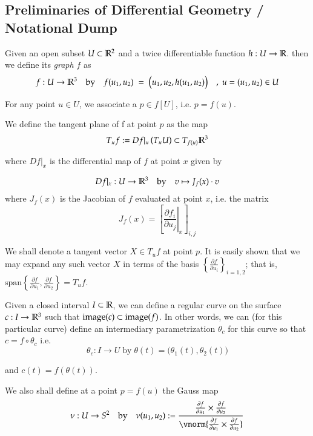         \subsection{Preliminaries of Differential Geometry / Notational Dump}
        
        Given an open subset $U\subset \mathbb{R}^2$ and a twice differentiable function  $h: U \to \mathbb{R}$.
        then we define its \textit{graph} $f$ as
        \[
	        f: U \to \mathbb{R}^3 \quad \textrm{by} \quad f(u_1, u_2) \;=\; \big(u_1 , u_2 , h(u_1,u_2)\big)
	        \quad,\; u = (u_1, u_2) \in U
        \]
        
        For any point $u \in U$, we associate a $p \in f[U]$, i.e. $p = f(u)$.
        
        We define the tangent plane of f at point $p$ as the map
        \[
        T_u f := Df\vert_u \left(T_u U\right) \subset T_{f(u)} \mathbb{R}^3
        \]
        
        where $Df\vert_x$ is the differential map of $f$ at point $x$ given by
        
        \[
	        Df|_x : U \to \mathbb{R}^3 \quad \textrm{by} \quad v \mapsto J_f (x) \cdot v
        \]
	  where $J_f(x)$ is the Jacobian of $f$ evaluated at point $x$, i.e. the matrix
	  \[
	  J_f (x) = \left[ \left.\frac{\partial f_i}{\partial u_j}\right\vert_x \right]_{i,j}
	  \]
	  
	  
	  We shall denote a tangent vector $X \in T_u f$ at point $p$. It is easily shown that we may expand any such vector $X$ in terms of the basis $\left\{ \frac{\partial f}{\partial u_i}\right\}_{i=1,2}$; that is,
	  $\textrm{span}\left\{ \frac{\partial f}{\partial u_1}, \frac{\partial f}{\partial u_2}\right\} = T_u f$.
	  
	  
	  Given a closed interval $I \subset \mathbb{R}$, we can define a regular curve on the surface
	  $c: I \to \mathbb{R}^3$ such that $\mathrm{image}(c) \subset \mathrm{image}(f)$. In other words, we can (for this particular curve) define an intermediary parametrization $\theta_c$ for this curve so that
      $ c = f \circ \theta_c $ i.e.
	  \[
	  \theta_c : I \to U \; \textrm{by} \; \theta(t) = \big(\theta_1(t), \theta_2(t)\big)
	  \]
	  
	  and $c(t) = f(\theta(t))$.
	  
	  We also shall define at a point $p = f(u)$ the Gauss map
	  \[\nu : U \to S^2 \quad\textrm{by}\quad  \nu(u_1, u_2) :=
	  \frac{\frac{\partial f}{\partial u_1} \times \frac{\partial f}{\partial u_2}}
	  {\vnorm{\frac{\partial f}{\partial u_1} \times \frac{\partial f}{\partial u_2}}} \]
	  
